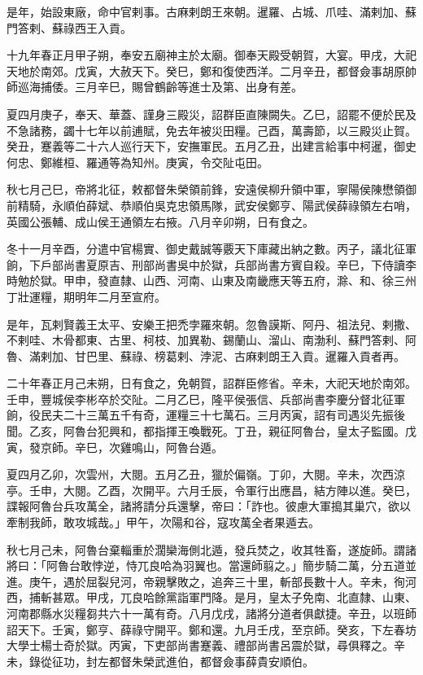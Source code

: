 \begin{pinyinscope}
是年，始設東廠，命中官剌事。古麻剌朗王來朝。暹羅、占城、爪哇、滿剌加、蘇門答剌、蘇祿西王入貢。

十九年春正月甲子朔，奉安五廟神主於太廟。御奉天殿受朝賀，大宴。甲戌，大祀天地於南郊。戊寅，大赦天下。癸巳，鄭和復使西洋。二月辛丑，都督僉事胡原帥師巡海捕倭。三月辛巳，賜曾鶴齡等進士及第、出身有差。

夏四月庚子，奉天、華蓋、謹身三殿災，詔群臣直陳闕失。乙巳，詔罷不便於民及不急諸務，蠲十七年以前逋賦，免去年被災田糧。己酉，萬壽節，以三殿災止賀。癸丑，蹇義等二十六人巡行天下，安撫軍民。五月乙丑，出建言給事中柯暹，御史何忠、鄭維桓、羅通等為知州。庚寅，令交阯屯田。

秋七月己巳，帝將北征，敕都督朱榮領前鋒，安遠侯柳升領中軍，寧陽侯陳懋領御前精騎，永順伯薛斌、恭順伯吳克忠領馬隊，武安侯鄭亨、陽武侯薛祿領左右哨，英國公張輔、成山侯王通領左右掖。八月辛卯朔，日有食之。

冬十一月辛酉，分遣中官楊實、御史戴誠等覈天下庫藏出納之數。丙子，議北征軍餉，下戶部尚書夏原吉、刑部尚書吳中於獄，兵部尚書方賓自殺。辛巳，下侍讀李時勉於獄。甲申，發直隸、山西、河南、山東及南畿應天等五府，滁、和、徐三州丁壯運糧，期明年二月至宣府。

是年，瓦剌賢義王太平、安樂王把禿孛羅來朝。忽魯謨斯、阿丹、祖法兒、剌撒、不剌哇、木骨都東、古里、柯枝、加異勒、錫蘭山、溜山、南渤利、蘇門答剌、阿魯、滿剌加、甘巴里、蘇祿、榜葛剌、浡泥、古麻剌朗王入貢。暹羅入貢者再。

二十年春正月己未朔，日有食之，免朝賀，詔群臣修省。辛未，大祀天地於南郊。壬申，豐城侯李彬卒於交阯。二月乙巳，隆平侯張信、兵部尚書李慶分督北征軍餉，役民夫二十三萬五千有奇，運糧三十七萬石。三月丙寅，詔有司遇災先振後聞。乙亥，阿魯台犯興和，都指揮王喚戰死。丁丑，親征阿魯台，皇太子監國。戊寅，發京師。辛巳，次雞鳴山，阿魯台遁。

夏四月乙卯，次雲州，大閱。五月乙丑，獵於偏嶺。丁卯，大閱。辛未，次西涼亭。壬申，大閱。乙酉，次開平。六月壬辰，令軍行出應昌，結方陣以進。癸巳，諜報阿魯台兵攻萬全，諸將請分兵還擊，帝曰：「詐也。彼慮大軍搗其巢穴，欲以牽制我師，敢攻城哉。」甲午，次陽和谷，寇攻萬全者果遁去。

秋七月己未，阿魯台棄輜重於濶欒海側北遁，發兵焚之，收其牲畜，遂旋師。謂諸將曰：「阿魯台敢悖逆，恃兀良哈為羽翼也。當還師翦之。」簡步騎二萬，分五道並進。庚午，遇於屈裂兒河，帝親擊敗之，追奔三十里，斬部長數十人。辛未，徇河西，捕斬甚眾。甲戌，兀良哈餘黨詣軍門降。是月，皇太子免南、北直隸、山東、河南郡縣水災糧芻共六十一萬有奇。八月戊戌，諸將分道者俱獻捷。辛丑，以班師詔天下。壬寅，鄭亨、薛祿守開平。鄭和還。九月壬戌，至京師。癸亥，下左春坊大學士楊士奇於獄。丙寅，下吏部尚書蹇義、禮部尚書呂震於獄，尋俱釋之。辛未，錄從征功，封左都督朱榮武進伯，都督僉事薛貴安順伯。


\end{pinyinscope}
